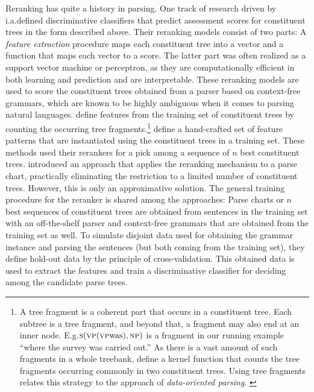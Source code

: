 \documentclass[../../document.tex]{subfiles}
\begin{document}
    Reranking has quite a history in parsing.
    One track of research driven by \citet{collins2001convolution,shen2003svm,collins05,huang2008forest} i.a.\@ defined discriminative classifiers that predict assessment scores for constituent trees in the form described above.
    Their reranking models consist of two parts:
        A \emph{feature extraction} procedure maps each constituent tree into a vector and a function that maps each vector to a score.
    The latter part was often realized as a support vector machine or perceptron, as they are computationally efficient in both learning and prediction and are interpretable.
    These reranking models are used to score the constituent trees obtained from a parser based on context-free grammars, which are known to be highly ambiguous when it comes to parsing natural languages.
     define features from the training set of constituent trees by counting the occurring tree fragments.\footnote{
        A tree fragment is a coherent part that occurs in a constituent tree.
        Each subtree is a tree fragment, and beyond that, a fragment may also end at an inner node.
        E.g.\@ \(\textsc{s} (\textsc{vp} (\textsc{vp} \text{was}), \textsc{np})\) is a fragment in our running example ``where the survey was carried out.''
        As there is a vast amount of such fragments in a whole treebank, \citet{collins2001convolution} define a kernel function that counts the tree fragments occurring commonly in two constituent trees.
        Using tree fragments relates this strategy to the approach of \emph{data-oriented parsing}. \citep{Bod92}
    }
     define a hand-crafted set of feature patterns that are instantiated using the constituent trees in a training set.
    These methods used their rerankers for a pick among a sequence of \(n\) best constituent trees.
     introduced an approach that applies the reranking mechanism to a parse chart, practically eliminating the restriction to a limited number of constituent trees.
    However, this is only an approximative solution.
    The general training procedure for the reranker is shared among the approaches:
        Parse charts or \(n\) best sequences of constituent trees are obtained from sentences in the training set with an off-the-shelf parser and context-free grammars that are obtained from the training set as well.
        To simulate disjoint data used for obtaining the grammar instance and parsing the sentences (but both coming from the training set), they define hold-out data by the principle of cross-validation.
        This obtained data is used to extract the features and train a discriminative classifier for deciding among the candidate parse trees.
        
\end{document}
